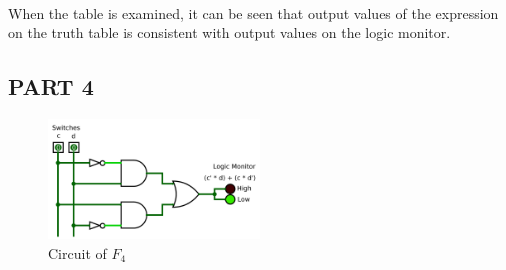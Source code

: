 \documentclass[pdftex,12pt,a4paper]{article}
\begin{document}
\begin{flushleft}

\paragraph{}
When the table is examined, it can be seen that output values of the expression on the truth table is consistent with output values on the logic monitor.
\end{flushleft}

\begin{flushleft}
\subsection{PART 4}

\begin{figure}[!h]
	\centering
	\includegraphics[width=0.5\textwidth]{part4.png}	
	\caption{Circuit of $F_4$}
	\label{fig1}
\end{figure}



\end{flushleft}
\end{document}
